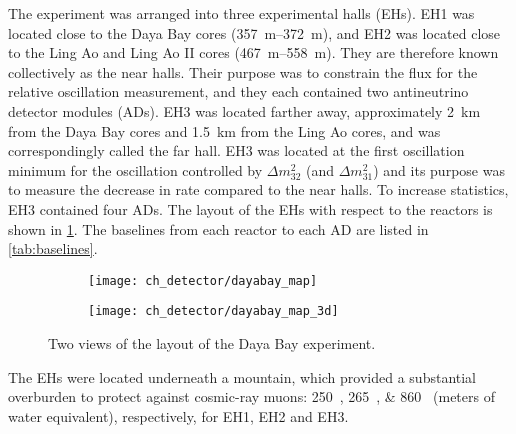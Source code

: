 The experiment was arranged into three experimental halls (EHs).
EH1 was located close to the Daya Bay cores (\SIrange{357}{372}{\meter}),
and EH2 was located close to the Ling Ao and Ling Ao II cores
(\SIrange{467}{558}{\meter}).
They are therefore known collectively as the near halls.
Their purpose was to constrain the \nuebar{} flux for the
relative oscillation measurement,
and they each contained two antineutrino detector modules (ADs).
EH3 was located farther away, approximately \SI{2}{\km} from the Daya Bay cores
and \SI{1.5}{\km} from the Ling Ao cores,
and was correspondingly called the far hall.
EH3 was located at the first oscillation minimum
for the oscillation controlled by $\Delta m^2_{32}$ (and $\Delta m^2_{31}$)
and its purpose was to measure the decrease in \nuebar{} rate compared to the near halls.
To increase statistics, EH3 contained four ADs.
The layout of the EHs with respect to the reactors is shown in \cref{fig:layout}.
The baselines from each reactor to each AD are listed in \cref{tab:baselines}.

\begin{figure}
    \centering
    \begin{subfigure}{0.49\textwidth}
        \texttt{[image: ch\_detector/dayabay\_map]}
    \end{subfigure}
    \begin{subfigure}{0.49\textwidth}
        \texttt{[image: ch\_detector/dayabay\_map\_3d]}
    \end{subfigure}
    \caption[Daya Bay geographic layout]{Two views of the layout of the Daya Bay experiment.}
    \label{fig:layout}
\end{figure}

The EHs were located underneath a mountain, which provided a substantial
overburden to protect against cosmic-ray muons:
\SIlist{250;265;860}{\mwe} (meters of water equivalent),
respectively, for EH1, EH2 and EH3.


